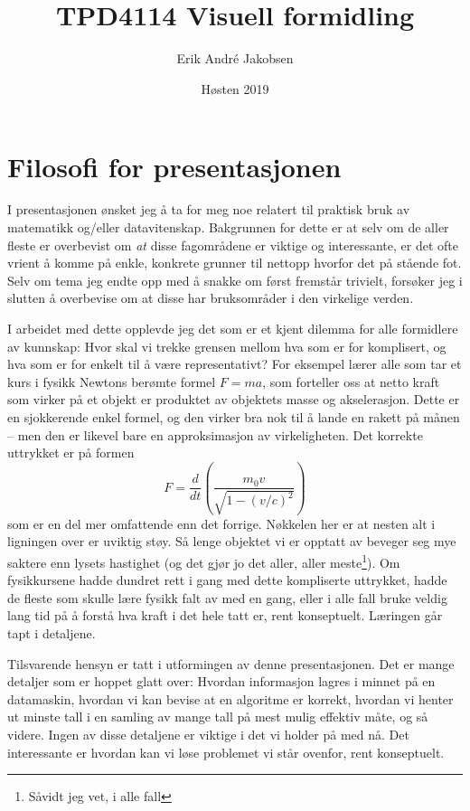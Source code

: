 \documentclass[a5paper]{article}
\title{\textb{Refleksjonsnotat} \\ {\large TPD4114 Visuell formidling}}
\author{Erik André Jakobsen}
\date{Høsten 2019}
\begin{document}
\RaggedRight

\maketitle

\section*{Filosofi for presentasjonen}
I presentasjonen ønsket jeg å ta for meg noe relatert til praktisk bruk av matematikk og/eller datavitenskap. Bakgrunnen for dette er at selv om de aller fleste er overbevist om \emph{at} disse fagområdene er viktige og interessante, er det ofte vrient å komme på enkle, konkrete grunner til nettopp hvorfor det på stående fot. Selv om tema jeg endte opp med å snakke om først fremstår trivielt, forsøker jeg i slutten å overbevise om at disse har bruksområder i den virkelige verden.

I arbeidet med dette opplevde jeg det som er et kjent dilemma for alle formidlere av kunnskap: Hvor skal vi trekke grensen mellom hva som er for komplisert, og hva som er for enkelt til å være representativt? For eksempel lærer alle som tar et kurs i fysikk Newtons berømte formel $F = ma$, som forteller oss at netto kraft som virker på et objekt er produktet av objektets masse og akselerasjon. Dette er en sjokkerende enkel formel, og den virker bra nok til å lande en rakett på månen -- men den er likevel bare en approksimasjon av virkeligheten. Det korrekte uttrykket er på formen
\begin{equation*}
    F = \frac{d}{dt} \left( \frac{m_0 v}{\sqrt{1 - \left( v/c \right)^2}} \right)
\end{equation*}
som er en del mer omfattende enn det forrige. Nøkkelen her er at nesten alt i ligningen over er uviktig støy. Så lenge objektet vi er opptatt av beveger seg mye saktere enn lysets hastighet (og det gjør jo det aller, aller meste\footnote{Såvidt jeg vet, i alle fall}). Om fysikkursene hadde dundret rett i gang med dette kompliserte uttrykket, hadde de fleste som skulle lære fysikk falt av med en gang, eller i alle fall bruke veldig lang tid på å forstå hva kraft i det hele tatt er, rent konseptuelt. Læringen går tapt i detaljene.

Tilsvarende hensyn er tatt i utformingen av denne presentasjonen. Det er mange detaljer som er hoppet glatt over: Hvordan informasjon lagres i minnet på en datamaskin, hvordan vi kan bevise at en algoritme er korrekt, hvordan vi henter ut minste tall i en samling av mange tall på mest mulig effektiv måte, og så videre. Ingen av disse detaljene er viktige i det vi holder på med nå. Det interessante er hvordan kan vi løse problemet vi står ovenfor, rent konseptuelt.
\end{document}

